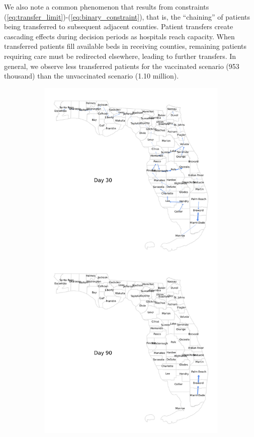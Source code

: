 \documentclass{article}
\begin{document}
We also note a common phenomenon that results from constraints (\ref{eq:transfer_limit})-(\ref{eq:binary_constraint}), that is, the ``chaining'' of patients being transferred to subsequent adjacent counties. Patient transfers create cascading effects during decision periods as hospitals reach capacity. When transferred patients fill available beds in receiving counties, remaining patients requiring care must be redirected elsewhere, leading to further transfers. In general, we observe less transferred patients for the vaccinated scenario (953 thousand) than the unvaccinated scenario (1.10 million).

\begin{figure}[h]
    \centering
    \begin{subfigure}{0.445\linewidth}
        \centering
        \includegraphics[width=\linewidth]{pics/paperStackedPatientTransfersVax0.1.png}

\end{subfigure}
\end{figure}
\end{document}
